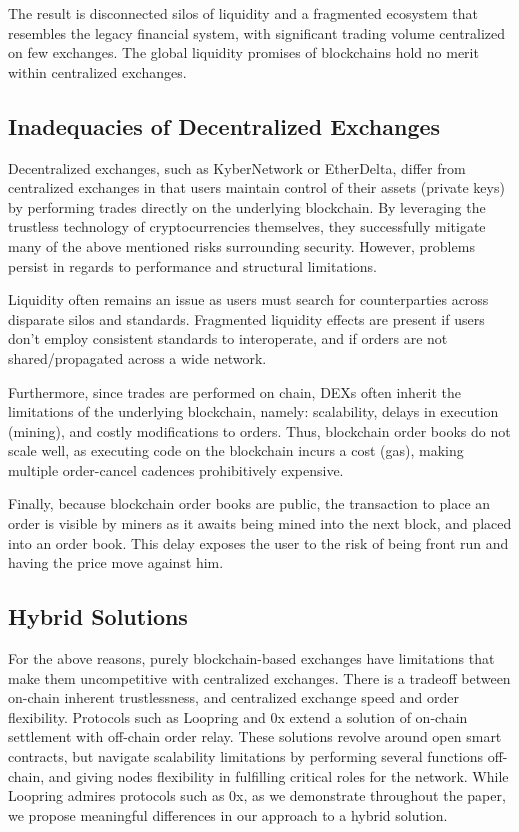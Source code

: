 \documentclass[UTF8,nofonts]{article}
\begin{document}
The result is disconnected silos of liquidity and a fragmented ecosystem that resembles the legacy financial system, with significant trading volume centralized on few exchanges. The global liquidity promises of blockchains hold no merit within centralized exchanges.

\subsection{Inadequacies of Decentralized Exchanges}
Decentralized exchanges, such as KyberNetwork or EtherDelta, differ from centralized exchanges in that users maintain control of their assets (private keys) by performing trades directly on the underlying blockchain. By leveraging the trustless technology of cryptocurrencies themselves, they successfully mitigate many of the above mentioned risks surrounding security. However, problems persist in regards to performance and structural limitations. 

Liquidity often remains an issue as users must search for counterparties across disparate silos and standards. Fragmented liquidity effects are present if users don’t employ consistent standards to interoperate, and if orders are not shared/propagated across a wide network. 

Furthermore, since trades are performed on chain, DEXs often inherit the limitations of the underlying blockchain, namely: scalability, delays in execution (mining), and costly modifications to orders. Thus, blockchain order books do not scale well, as executing code on the blockchain incurs a cost (gas), making multiple order-cancel cadences prohibitively expensive. 

Finally, because blockchain order books are public, the transaction to place an order is visible by miners as it awaits being mined into the next block, and placed into an order book. This delay exposes the user to the risk of being front run and having the price move against him.

\subsection{Hybrid Solutions}
For the above reasons, purely blockchain-based exchanges have limitations that make them uncompetitive with centralized exchanges. There is a tradeoff between on-chain inherent trustlessness, and centralized exchange speed and order flexibility. Protocols such as Loopring and 0x extend a solution of on-chain settlement with off-chain order relay. These solutions revolve around open smart contracts, but navigate scalability limitations by performing several functions off-chain, and giving nodes flexibility in fulfilling critical roles for the network. While Loopring admires protocols such as 0x, as we demonstrate throughout the paper, we propose meaningful differences in our approach to a hybrid solution.
\end{document}
